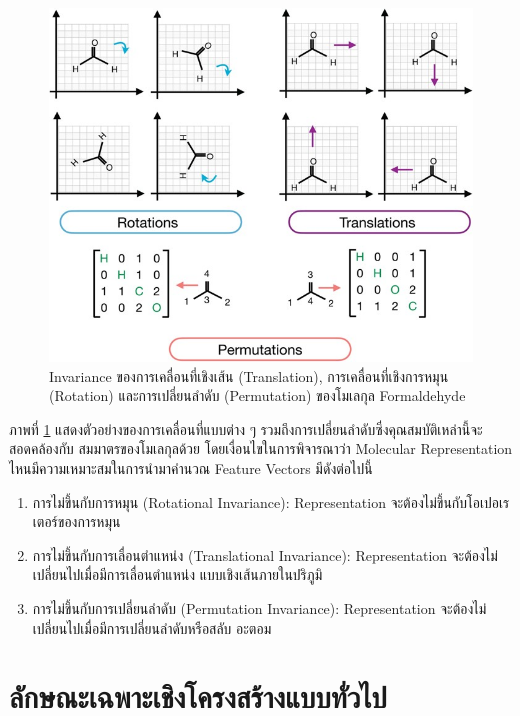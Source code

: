 \begin{figure}[htbp]
    \centering
    \includegraphics[width=\linewidth]{fig/mol_rep_invar.jpg}
    \caption{Invariance ของการเคลื่อนที่เชิงเส้น (Translation), การเคลื่อนที่เชิงการหมุน (Rotation) และการเปลี่ยนลำดับ
        (Permutation) ของโมเลกุล Formaldehyde}
    \label{fig:mol_rep_invariance}
\end{figure}

ภาพที่ \ref{fig:mol_rep_invariance} แสดงตัวอย่างของการเคลื่อนที่แบบต่าง ๆ รวมถึงการเปลี่ยนลำดับซึ่งคุณสมบัติเหล่านี้จะสอดคล้องกับ%
สมมาตรของโมเลกุลด้วย โดยเงื่อนไขในการพิจารณาว่า Molecular Representation ไหนมีความเหมาะสมในการนำมาคำนวณ Feature Vectors
มีดังต่อไปนี้

\begin{enumerate}[topsep=0pt]
    \item การไม่ขึ้นกับการหมุน (Rotational Invariance): Representation จะต้องไม่ขึ้นกับโอเปอเรเตอร์ของการหมุน

    \item การไม่ขึ้นกับการเลื่อนตำแหน่ง (Translational Invariance): Representation จะต้องไม่เปลี่ยนไปเมื่อมีการเลื่อนตำแหน่ง%
          แบบเชิงเส้นภายในปริภูมิ

    \item การไม่ขึ้นกับการเปลี่ยนลำดับ (Permutation Invariance): Representation จะต้องไม่เปลี่ยนไปเมื่อมีการเปลี่ยนลำดับหรือสลับ%
          อะตอม
\end{enumerate}

\section{ลักษณะเฉพาะเชิงโครงสร้างแบบทั่วไป}
\label{sec:struc_feat}

